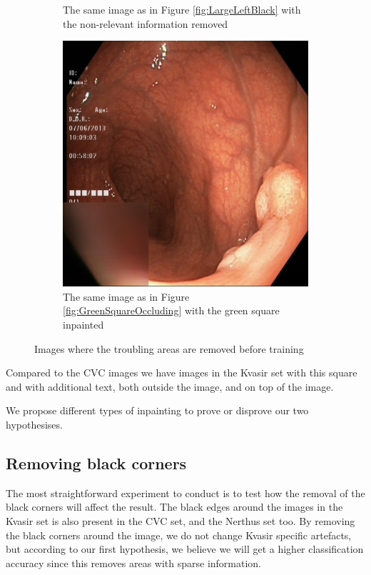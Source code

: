 \begin{figure}
\begin{subfigure}[b]{0.4\textwidth}
         \caption{The same image as in Figure \ref{fig:LargeLeftBlack} with the non-relevant information removed}
         \label{fig:LargeLeftBlackFIX}
     \end{subfigure}
     \hfill
     \begin{subfigure}[b]{0.4\textwidth}
         \centering
         \includegraphics[width=\textwidth]{experiments/figures/nogreenframe.jpg}
         \caption{The same image as in Figure \ref{fig:GreenSquareOccluding} with the green square inpainted}
         \label{fig:GreenSquareOccludingFIX}
     \end{subfigure}
        \caption{Images where the troubling areas are removed before training}
        \label{fig:KvasirAnomaliesFIX}
\end{figure}



Compared to the CVC images we have images in the Kvasir set with this square and with additional text, both outside the image, and on top of the image.  

We propose different types of inpainting to prove or disprove our two hypothesises.

\subsection{Removing black corners}
The most straightforward experiment to conduct is to test how the removal of the black corners will affect the result. 
The black edges around the images in the Kvasir set is also present in the CVC set, and the Nerthus set too. By removing the black corners around the image, we do not change Kvasir specific artefacts, but according to our first hypothesis, we believe we will get a higher classification accuracy since this removes areas with sparse information.

